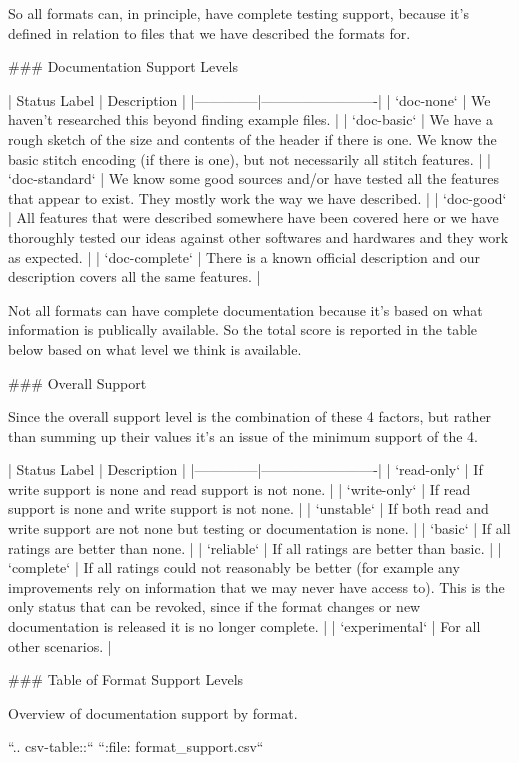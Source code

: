 So all formats can, in principle, have complete testing support, because it's
defined in relation to files that we have described the formats for.

### Documentation Support Levels

| Status Label | Description             |
|--------------|-------------------------|
| `doc-none` | We haven't researched this beyond finding example files. |
| `doc-basic` | We have a rough sketch of the size and contents of the header if there is one. We know the basic stitch encoding (if there is one), but not necessarily all stitch features. |
| `doc-standard` | We know some good sources and/or have tested all the features that appear to exist. They mostly work the way we have described. |
| `doc-good` | All features that were described somewhere have been covered here or we have thoroughly tested our ideas against other softwares and hardwares and they work as expected. |
| `doc-complete` | There is a known official description and our description covers all the same features. |

Not all formats can have complete documentation because it's based on what
information is publically available. So the total score is reported in the table
below based on what level we think is available.

### Overall Support

Since the overall support level is the combination of these
4 factors, but rather than summing up their values it's an
issue of the minimum support of the 4.

| Status Label | Description             |
|--------------|-------------------------|
| `read-only` | If write support is none and read support is not none. |
| `write-only` | If read support is none and write support is not none. |
| `unstable` | If both read and write support are not none but testing or documentation is none. |
| `basic` | If all ratings are better than none. |
| `reliable` | If all ratings are better than basic. |
| `complete` | If all ratings could not reasonably be better (for example any improvements rely on information that we may never have access to). This is the only status that can be revoked, since if the format changes or new documentation is released it is no longer complete. |
| `experimental` | For all other scenarios. |

### Table of Format Support Levels

Overview of documentation support by format.

``.. csv-table::``
``:file: format\_support.csv``

